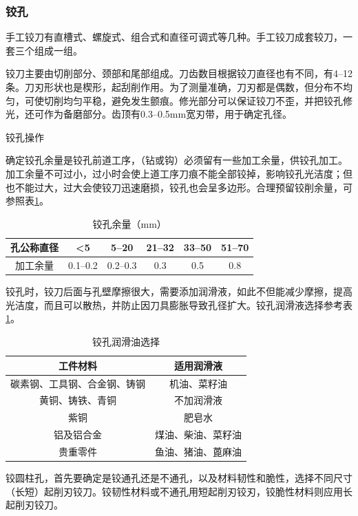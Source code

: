 \documentclass{ctexbook}
\begin{document}
\subsubsection{铰孔}
手工铰刀有直槽式、螺旋式、组合式和直径可调式等几种。手工铰刀成套较刀，一套三个组成一组。

铰刀主要由切削部分、颈部和尾部组成。刀齿数目根据铰刀直径也有不同，有4--12条。刀刃形状也是楔形，起刮削作用。为了测量准确，刀刃都是偶数，但分布不均匀，可使切削均匀平稳，避免发生颤痕。修光部分可以保证铰刀不歪，并把铰孔修光，还可作为备磨部分。齿顶有0.3--0.5mm宽刃带，用于确定孔径。

铰孔操作

确定铰孔余量是铰孔前道工序，（钻或钩）必须留有一些加工余量，供铰孔加工。加工余量不可过小，过小时会使上道工序刀痕不能全部铰掉，影响铰孔光洁度；但也不能过大，过大会使铰刀迅速磨损，铰孔也会呈多边形。合理预留铰削余量，可参照表\ref{tab:jiaokongyuliang}。

\begin{table}[htbp]
	\centering
	\caption{铰孔余量（mm）}
	\begin{tabular}{c|c|c|c|c|c}
		\hline
		孔公称直径 & <5    & 5--20& 21--32 & 33--50 & 51--70\\ \hline
		加工余量  & 0.1--0.2 & 0.2--0.3 & 0.3   & 0.5   & 0.8 \\ \hline
	\end{tabular}%
	\label{tab:jiaokongyuliang}%
\end{table}%
铰孔时，铰刀后面与孔壁摩擦很大，需要添加润滑液，如此不但能减少摩擦，提高光洁度，而且可以散热，并防止因刀具膨胀导致孔径扩大。铰孔润滑液选择参考表\ref{tab:jiaokongyuliang}。
\begin{table}[htbp]
	\centering
	\caption{铰孔润滑油选择}
	\begin{tabular}{c|c}
		\hline
		工件材料  & 适用润滑液 \\ \hline
		碳素钢、工具钢、合金钢、铸钢 & 机油、菜籽油 \\ \hline
		黄铜、铸铁、青铜 & 不加润滑液 \\ \hline
		紫铜    & 肥皂水 \\ \hline
		铝及铝合金 & 煤油、柴油、菜籽油 \\ \hline
		贵重零件  & 鱼油、猪油、蓖麻油 \\ \hline
	\end{tabular}%
	\label{tab:runhuayou}%
\end{table}%
铰圆柱孔，首先要确定是铰通孔还是不通孔，以及材料韧性和脆性，选择不同尺寸（长短）起削刃铰刀。铰韧性材料或不通孔用短起削刃铰刃，铰脆性材料则应用长起削刃铰刀。
\end{document}
